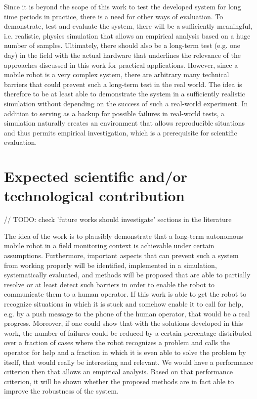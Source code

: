 \documentclass[german, master, expose, latin1]{base/thesis_KBS}
\begin{document}
Since it is beyond the scope of this work to test the developed system for long time periods in practice, there is a need for other ways of evaluation.
To demonstrate, test and evaluate the system, there will be a sufficiently meaningful, i.e. realistic, physics simulation that allows an empirical analysis based 
on a huge number of samples. Ultimately, there should also be a long-term test (e.g. one day) in the field with the actual hardware that underlines the relevance of 
the approaches discussed in this work for practical applications. However, since a mobile robot is a very complex system, there are arbitrary many technical barriers 
that could prevent such a long-term test in the real world. The idea is therefore to be at least able to demonstrate the system in a sufficiently realistic simulation 
without depending on the success of such a real-world experiment. In addition to serving as a backup for possible failures in real-world tests, a simulation naturally 
creates an environment that allows reproducible situations and thus permits empirical investigation, which is a prerequisite for scientific evaluation.

\pagebreak

\section{Expected scientific and/or technological contribution}

// TODO: check 'future works should investigate' sections in the literature\newline

The idea of the work is to plausibly demonstrate that a long-term autonomous mobile robot in a field monitoring context is achievable under certain assumptions.
Furthermore, important aspects that can prevent such a system from working properly will be identified, implemented in a simulation, systematically evaluated,
and methods will be proposed that are able to partially resolve or at least detect such barriers in order to enable the robot to communicate them to a human operator.
If this work is able to get the robot to recognize situations in which it is stuck and somehow enable it to call for help, e.g. by a push message to
the phone of the human operator, that would be a real progress. Moreover, if one could show that with the solutions developed in this work, the number of failures
could be reduced by a certain percentage distributed over a fraction of cases where the robot recognizes a problem and calls the operator for help and a fraction
in which it is even able to solve the problem by itself, that would really be interesting and relevant. We would have a performance criterion then that allows 
an empirical analysis. Based on that performance criterion, it will be shown whether the proposed methods are in fact able to improve the robustness of the system.\newline
\end{document}
